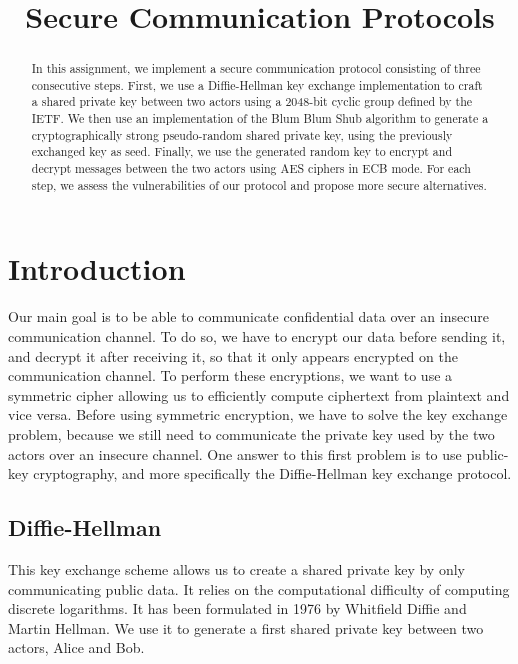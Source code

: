 \documentclass{article}
\title{\textbf{Secure Communication Protocols}}
\author{}
\date{}
\begin{document}
\maketitle \thispagestyle{fancy}

\begin{abstract}
    In this assignment, we implement a secure communication protocol consisting of three consecutive steps. First, we use a Diffie-Hellman\cite{Diffie76newdirections}\cite{Graham78securecommunications} key exchange implementation to craft a shared private key between two actors using a 2048-bit cyclic group defined by the IETF. We then use an implementation of the Blum Blum Shub\cite{Blum1986} algorithm to generate a cryptographically strong pseudo-random shared private key, using the previously exchanged key as seed. Finally, we use the generated random key to encrypt and decrypt messages between the two actors using AES\cite{Daemen99aesproposal} ciphers in ECB mode. For each step, we assess the vulnerabilities of our protocol and propose more secure alternatives. 
\end{abstract}

\section{Introduction}

Our main goal is to be able to communicate confidential data over an insecure communication channel. To do so, we have to encrypt our data before sending it, and decrypt it after receiving it, so that it only appears encrypted on the communication channel.
To perform these encryptions, we want to use a symmetric cipher allowing us to efficiently compute ciphertext from plaintext and vice versa. Before using symmetric encryption, we have to solve the key exchange problem, because we still need to communicate the private key used by the two actors over an insecure channel.
One answer to this first problem is to use public-key cryptography, and more specifically the Diffie-Hellman key exchange protocol.

\subsection{Diffie-Hellman}

This key exchange scheme allows us to create a shared private key by only communicating public data. It relies on the computational difficulty of computing discrete logarithms. It has been formulated in 1976 by Whitfield Diffie and Martin Hellman\cite{Diffie76newdirections}\cite{Graham78securecommunications}. We use it to generate a first shared private key between two actors, Alice and Bob.
\end{document}
